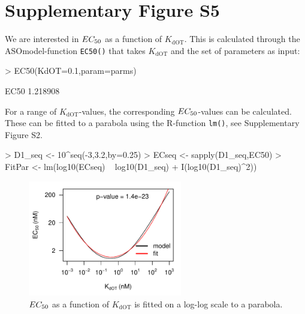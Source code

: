 \documentclass[a4paper,11pt]{article}
\newenvironment{Ncenter}{%
  \setlength\topsep{-10pt}
  \setlength\parskip{-10pt}
  \begin{center}
}{%
  \end{center}
}
\newcommand{\EC}{EC_{\rm{50}}}
\newcommand{\KdOT}{K_{\mathrm{dOT}}}
\begin{document}
\section{Supplementary Figure S5}
 We are interested in $\EC$ as a function of $\KdOT$. This is calculated through the ASOmodel-function \texttt{EC50()} that takes $\KdOT$ and the set of parameters as input:
\begin{Schunk}
\begin{Sinput}
> EC50(KdOT=0.1,param=parms)
\end{Sinput}
\begin{Soutput}
    EC50 
1.218908 
\end{Soutput}
\end{Schunk}
For a range of $\KdOT$-values, the corresponding $\EC$-values can be calculated. These can be fitted to a parabola using the R-function \texttt{lm()}, see Supplementary Figure S2. 
\begin{Schunk}
\begin{Sinput}
> D1_seq <- 10^seq(-3,3.2,by=0.25)
> ECseq <- sapply(D1_seq,EC50)
> FitPar <- lm(log10(ECseq) ~ log10(D1_seq) + I(log10(D1_seq)^2))
\end{Sinput}
\end{Schunk}
\begin{figure}[!h]
\begin{Ncenter}
\includegraphics[width=0.6\textwidth]{SuppFile1-S31.pdf}
\end{Ncenter}
\caption{$\EC$ as a function of $\KdOT$ is fitted on a log-log scale to a parabola.}\label{fig::Optfit}
\end{figure}
\end{document}
